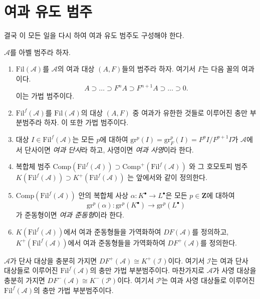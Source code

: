 \section{여과 유도 범주}
\label{section-filtered-derived-category}

\noindent
결국 이 모든 일을 다시 하여 여과 유도 범주도 구성해야 한다.

\begin{definition}
\label{definition-filtered}
$\mathcal{A}$를 아벨 범주라 하자.
\begin{enumerate}
\item $\text{Fil}(\mathcal{A})$를 $\mathcal{A}$의 여과 대상
$(A, F)$들의 범주라 하자. 여기서 $F$는 다음 꼴의 여과이다.
$$
A \supset \ldots \supset F^n A \supset F^{n+1}A \supset \ldots
\supset 0.
$$
이는 가법 범주이다.
\item $\text{Fil}^f(\mathcal{A})$를 $\text{Fil}(\mathcal{A})$의 대상
$(A, F)$ 중 여과가 유한한 것들로 이루어진 충만 부분범주라 하자.
이 또한 가법 범주이다.
\item 대상 $I \in \text{Fil}^f(\mathcal{A})$는 모든 $p$에 대하여
$\text{gr}^p(I) = \text{gr}_F^p(I) = F^pI/F^{p+1}I$가 $\mathcal{A}$에서
단사이면 {\it 여과 단사}라 하고, 사영이면 {\it 여과 사영}이라 한다.
\item 복합체 범주
$\text{Comp}(\text{Fil}^f(\mathcal{A})) \supset
\text{Comp}^+(\text{Fil}^f(\mathcal{A}))$
와 그 호모토피 범주
$K(\text{Fil}^f(\mathcal{A})) \supset K^+(\text{Fil}^f(\mathcal A))$
는 앞에서와 같이 정의한다.
\item $\text{Comp}(\text{Fil}^f(\mathcal{A}))$ 안의 복합체 사상
$\alpha : K^\bullet \to L^\bullet$은 모든 $p \in \mathbf{Z}$에 대하여
$$
\text{gr}^p(\alpha): \text{gr}^p(K^\bullet) \to \text{gr}^p(L^\bullet)
$$
가 준동형이면 {\it 여과 준동형}이라 한다.
\item $K(\text{Fil}^f(\mathcal{A}))$에서 여과 준동형들을 가역화하여
$DF(\mathcal{A})$를 정의하고, $K^+(\text{Fil}^f(\mathcal{A}))$에서
여과 준동형들을 가역화하여 $DF^+(\mathcal{A})$를 정의한다.
\end{enumerate}
\end{definition}

\begin{lemma}
\label{lemma-filtered-derived-category}
$\mathcal{A}$가 단사 대상을 충분히 가지면
$DF^+(\mathcal{A}) \cong K^+(\mathcal{I})$이다. 여기서
$\mathcal{I}$는 여과 단사 대상들로 이루어진
$\text{Fil}^f(\mathcal{A})$의 충만 가법 부분범주이다. 마찬가지로
$\mathcal{A}$가 사영 대상을 충분히 가지면
$DF^-(\mathcal{A}) \cong K^-(\mathcal{P})$이다. 여기서
$\mathcal P$는 여과 사영 대상들로 이루어진
$\text{Fil}^f(\mathcal{A})$의 충만 가법 부분범주이다.
\end{lemma}

